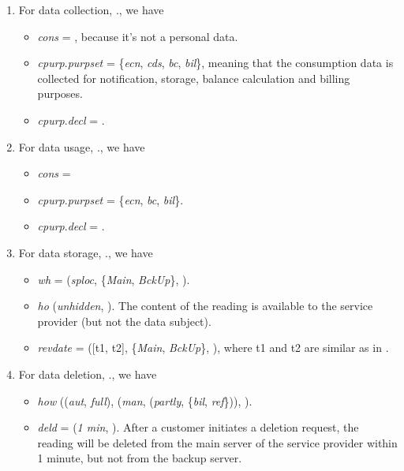 \documentclass[a4paper]{article}
\begin{document}
\begin{enumerate}
\item For data collection, ., we have 
\begin{itemize}
\item \textit{cons} = , because it's not a personal data.  
\item  \textit{cpurp}.\textit{purpset} = \{\textit{ecn},  \textit{cds}, \textit{bc}, \textit{bil}\}, meaning that the consumption data is collected for notification, storage, balance calculation and billing purposes.  
\item \textit{cpurp}.\textit{decl} = .  
\end{itemize}

\item For data usage, ., we have 
\begin{itemize}
\item \textit{cons} =  
\item  \textit{cpurp}.\textit{purpset} = \{\textit{ecn},   \textit{bc}, \textit{bil}\}. 
\item \textit{cpurp}.\textit{decl} = .  
\end{itemize}

\item For data storage, ., we have 
\begin{itemize} 
\item \textit{wh} = (\textit{sploc}, \{\textit{Main}, \textit{BckUp}\}, ).     

\item \textit{ho}  (\textit{unhidden},  ). The content of the reading is available to the service provider (but not the data subject).

\item \textit{revdate} = ([t1, t2], \{\textit{Main}, \textit{BckUp}\}, ), where t1 and t2 are similar as in .   
\end{itemize}   

\item For data deletion, ., we have 
\begin{itemize} 
\item \textit{how}  ((\textit{aut}, \textit{full}), (\textit{man}, (\textit{partly}, \{\textit{bil}, \textit{ref}\})), ). 

\item \textit{deld} = (\textit{1 min}, ).  After a customer initiates a deletion request, the reading will be deleted from the main server of the service provider within 1 minute, but not from the backup server.          


\end{itemize}
\end{enumerate}
\end{document}
